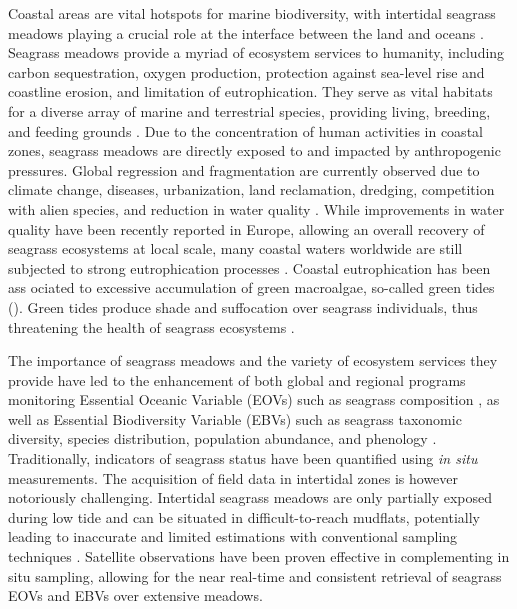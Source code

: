 \documentclass[
  number]{elsarticle}
\begin{document}
Coastal areas are vital hotspots for marine biodiversity, with
intertidal seagrass meadows playing a crucial role at the interface
between the land and oceans \citep{unsworth2022}. Seagrass meadows
provide a myriad of ecosystem services to humanity, including carbon
sequestration, oxygen production, protection against sea-level rise and
coastline erosion, and limitation of eutrophication. They serve as vital
habitats for a diverse array of marine and terrestrial species,
providing living, breeding, and feeding grounds \citetext{\citealp[
]{gardner2018}; \citealp[ ]{Zoffoli2022}; \citealp{jankowska2019}}. Due
to the concentration of human activities in coastal zones, seagrass
meadows are directly exposed to and impacted by anthropogenic pressures.
Global regression and fragmentation are currently observed due to
climate change, diseases, urbanization, land reclamation, dredging,
competition with alien species, and reduction in water quality
\citetext{\citealp[ ]{nguyen2021}; \citealp[ ]{soissons2018}; \citealp[
]{orth2006}; \citealp[ ]{lin2018}; \citealp[ ]{duffy2019}; \citealp[
]{rasheed2011long}; \citealp{chefaoui2018dramatic}}. While improvements
in water quality have been recently reported in Europe, allowing an
overall recovery of seagrass ecosystems at local scale, many coastal
waters worldwide are still subjected to strong eutrophication processes
\citetext{\citealp[ ]{deSantos2019}; \citealp{Zoffoli2021}}. Coastal
eutrophication has been ass ociated to excessive accumulation of green
macroalgae, so-called green tides (\citep{devlin2023nutrients}). Green
tides produce shade and suffocation over seagrass individuals, thus
threatening the health of seagrass ecosystems \citep{wang2022}.

The importance of seagrass meadows and the variety of ecosystem services
they provide have led to the enhancement of both global and regional
programs monitoring Essential Oceanic Variable (EOVs) such as seagrass
composition \citep{Miloslavich2018}, as well as Essential Biodiversity
Variable (EBVs) such as seagrass taxonomic diversity, species
distribution, population abundance, and phenology \citep{Pereira2013}.
Traditionally, indicators of seagrass status have been quantified using
\emph{in situ} measurements. The acquisition of field data in intertidal
zones is however notoriously challenging. Intertidal seagrass meadows
are only partially exposed during low tide and can be situated in
difficult-to-reach mudflats, potentially leading to inaccurate and
limited estimations with conventional sampling techniques
\citep{nijland2019}. Satellite observations have been proven effective
in complementing in situ sampling, allowing for the near real-time and
consistent retrieval of seagrass EOVs and EBVs over extensive meadows.
\citetext{\citealp[ ]{Zoffoli2021}; \citealp[ ]{xu2021}; \citealp[
]{Traganos2018}; \citealp{coffer2023}}
\end{document}

